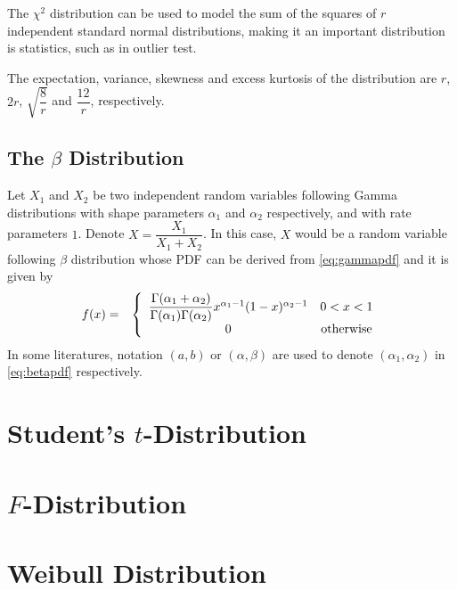 The $\chi^2$ distribution can be used to model the sum of the squares of $r$ independent standard normal distributions, making it an important distribution is statistics, such as in outlier test. 

The expectation, variance, skewness and excess kurtosis of the distribution are $r$, $2r$, $\sqrt{\dfrac{8}{r}}$ and $\dfrac{12}{r}$, respectively.

\subsection{The $\beta$ Distribution}

Let $X_1$ and $X_2$ be two independent random variables following Gamma distributions with shape parameters $\alpha_1$ and $\alpha_2$ respectively, and with rate parameters $1$. Denote $X=\dfrac{X_1}{X_1+X_2}$. In this case, $X$ would be a random variable following $\beta$ distribution whose PDF can be derived from \eqref{eq:gammapdf} and it is given by
\begin{eqnarray}
  f(x) &=& \left\{\begin{array}{cc}
                    \dfrac{\Gamma(\alpha_1 + \alpha_2)}{\Gamma(\alpha_1)\Gamma(\alpha_2)}x^{\alpha_1-1}(1-x)^{\alpha_2-1} & 0 < x < 1 \\
                    0 & \textup{otherwise}
                  \end{array}\right. \label{eq:betapdf}
\end{eqnarray}
In some literatures, notation $(a, b)$ or $(\alpha, \beta)$ are used to denote $(\alpha_1, \alpha_2)$ in \eqref{eq:betapdf} respectively.


\section{Student's $t$-Distribution}

\section{$F$-Distribution}

\section{Weibull Distribution} 